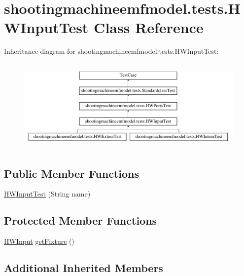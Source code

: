 \hypertarget{classshootingmachineemfmodel_1_1tests_1_1_h_w_input_test}{\section{shootingmachineemfmodel.\-tests.\-H\-W\-Input\-Test Class Reference}
\label{classshootingmachineemfmodel_1_1tests_1_1_h_w_input_test}
}
Inheritance diagram for shootingmachineemfmodel.\-tests.\-H\-W\-Input\-Test\-:\begin{figure}[H]
\begin{center}
\leavevmode
\includegraphics[height=4.620462cm]{classshootingmachineemfmodel_1_1tests_1_1_h_w_input_test}
\end{center}
\end{figure}
\subsection*{Public Member Functions}
\begin{DoxyCompactItemize}
\item 
\hyperlink{classshootingmachineemfmodel_1_1tests_1_1_h_w_input_test_a45792922856e4ff7cac42ebc3159a5ec}{H\-W\-Input\-Test} (String name)
\end{DoxyCompactItemize}
\subsection*{Protected Member Functions}
\begin{DoxyCompactItemize}
\item 
\hyperlink{interfaceshootingmachineemfmodel_1_1_h_w_input}{H\-W\-Input} \hyperlink{classshootingmachineemfmodel_1_1tests_1_1_h_w_input_test_a8ab93dd0880c3daf9d4eb09e7600b44f}{get\-Fixture} ()
\end{DoxyCompactItemize}
\subsection*{Additional Inherited Members}


